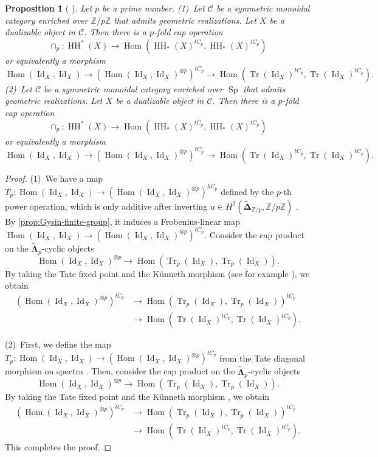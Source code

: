 \documentclass[11pt]{amsart}
\numberwithin{equation}{section}
\theoremstyle{plain}
\newtheorem{Prop}[prop]{Proposition}
\theoremstyle{definition}
\theoremstyle{remark}
\newcommand{\bZ} { {\mathbb{Z}}}
\newcommand{\cC} { {\mathcal{C}}}
\newcommand{\Id}{{\operatorname{Id}}}
\newcommand\HH{\operatorname{HH}}
\newcommand\Tr{\operatorname{Tr}}
\newcommand\Hom{\operatorname{Hom}}
\newcommand\Sp{ {\operatorname{Sp} } }
\begin{document}
\begin{Prop}[{\cite[Section 2]{Chen2} \cite[Section 3]{Rezchikov}}]\label{prop:power construction}Let $p$ be a prime number.
    (1)~Let $\cC$ be a symmetric monoidal category enriched over \textbf{$\bZ/p\bZ$} that admits geometric realizations. Let $X$ be a dualizable object in $\cC$. Then there is a $p$-fold cap operation 
    \[\cap_p:\HH^*(X) \to \Hom(\HH_*(X)^{tC_p}, \HH_*(X)^{tC_p})\]
    or equivalently a morphism
    \[\Hom(\Id_X, \Id_X) \to (\Hom(\Id_X, \Id_X)^{\otimes p})^{tC_p} \to \Hom(\Tr(\Id_X)^{tC_p}, \Tr(\Id_X)^{tC_p}).\]
    (2)~Let $\cC$ be a symmetric monoidal category enriched over \textbf{$\Sp$} that admits geometric realizations. Let $X$ be a dualizable object in $\cC$. Then there is a $p$-fold cap operation 
    \[\cap_p:\HH^*(X) \to \Hom(\HH_*(X)^{tC_p}, \HH_*(X)^{tC_p})\]
    or equivalently a morphism
    \[\Hom(\Id_X, \Id_X) \to (\Hom(\Id_X, \Id_X)^{\otimes p})^{tC_p} \to \Hom(\Tr(\Id_X)^{tC_p}, \Tr(\Id_X)^{tC_p}).\]
\end{Prop}
\begin{proof}
    (1)~We have a map $T_p: \Hom(\Id_X, \Id_X) \to (\Hom(\Id_X, \Id_X)^{\otimes p})^{hC_p}$ defined by the $p$-th power operation, which is only additive after inverting $u \in H^2(\widetilde{\boldsymbol{\Delta}}_{\bZ/p}, \bZ/p\bZ)$ \cite[Lemma 2.5]{SeidelWilkins}. By \autoref{prop:Gysin-finite-group}, it induces a Frobenius-linear map $\Hom(\Id_X, \Id_X) \to (\Hom(\Id_X, \Id_X)^{\otimes p})^{tC_p}$. Consider the cap product on the $\boldsymbol{\widetilde{\Lambda}}_p$-cyclic objects
    \[\Hom(\Id_X, \Id_X)^{\otimes p} \to \Hom(\Tr_p(\Id_X), \Tr_p(\Id_X)).\]
    By taking the Tate fixed point and the K\"unneth morphism (see for example \cite{BlumbergMandell}), we obtain
    \begin{align*}(\Hom(\Id_X, \Id_X)^{\otimes p})^{tC_p} &\to \Hom(\Tr_p(\Id_X), \Tr_p(\Id_X))^{tC_p} \\
    &\to \Hom(\Tr(\Id_X)^{tC_p}, \Tr(\Id_X)^{tC_p}).
    \end{align*}
    
    (2)~First, we define the map $T_p: \Hom(\Id_X, \Id_X) \to (\Hom(\Id_X, \Id_X)^{\otimes p})^{tC_p}$ from the Tate diagonal morphism on spectra \cite[Section III.1]{Nikolaus-Scholze-Ontopologicalcyclichomology}. Then, consider the cap product on the $\boldsymbol{\widetilde{\Lambda}}_p$-cyclic objects
    \[\Hom(\Id_X, \Id_X)^{\otimes p} \to \Hom(\Tr_p(\Id_X), \Tr_p(\Id_X)).\]
    By taking the Tate fixed point and the K\"unneth morphism \cite{BlumbergMandell}, we obtain
    \begin{align*}(\Hom(\Id_X, \Id_X)^{\otimes p})^{tC_p} &\to \Hom(\Tr_p(\Id_X), \Tr_p(\Id_X))^{tC_p} \\
    &\to \Hom(\Tr(\Id_X)^{tC_p}, \Tr(\Id_X)^{tC_p}).
    \end{align*}
    This completes the proof.
\end{proof}
\end{document}
